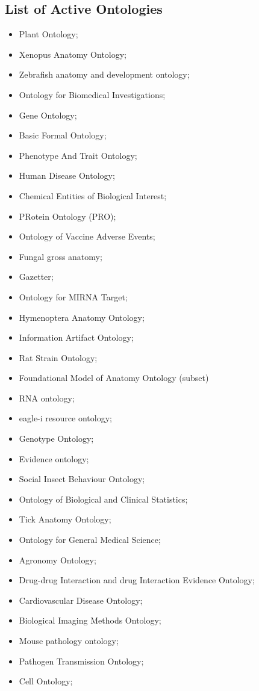 \documentclass{cisfyp}
\begin{document}
\begin{appendices}
\chapter{List of Active Ontologies}
\begin{multicols}{2}
\begin{itemize}
	\item Plant Ontology; \item Xenopus Anatomy Ontology; \item Zebrafish anatomy and development ontology;
	\item Ontology for Biomedical Investigations; \item Gene Ontology; \item Basic Formal Ontology;
	\item Phenotype And Trait Ontology; \item Human Disease Ontology; \item Chemical Entities of Biological Interest;
	\item PRotein Ontology (PRO); \item Ontology of Vaccine Adverse Events; \item Fungal gross anatomy;
	\item Gazetter; \item Ontology for MIRNA Target; \item Hymenoptera Anatomy Ontology;
	\item Information Artifact Ontology; \item Rat Strain Ontology; \item Foundational Model of Anatomy Ontology (subset)
	\item RNA ontology; \item eagle-i resource ontology; \item Genotype Ontology;
	\item Evidence ontology; \item Social Insect Behaviour Ontology; \item Ontology of Biological and Clinical Statistics;
	\item Tick Anatomy Ontology; \item Ontology for General Medical Science; \item Agronomy Ontology;
	\item Drug-drug Interaction and drug Interaction Evidence Ontology; \item Cardiovascular Disease Ontology;
	\item Biological Imaging Methods Ontology; \item Mouse pathology ontology; \item Pathogen Transmission Ontology; \item Cell Ontology;

\end{itemize}
\end{multicols}
\end{appendices}
\end{document}
